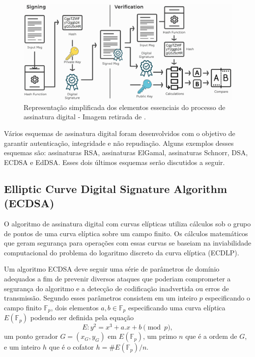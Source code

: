 \begin{figure}[h]
	\centering
	\includegraphics[keepaspectratio=true,scale=0.45]{figuras/assinatura digital.png}
	\caption{Representação simplificada dos elementos essenciais do processo de assinatura digital - Imagem retirada de \cite{nakov2018}.}
	\label{assinaturaDigitalSimp}
\end{figure}

Vários esquemas de assinatura digital foram desenvolvidos com o objetivo de garantir autenticação, integridade e não repudiação. Alguns exemplos desses esquemas são: assinaturas RSA, assinaturas ElGamal, assinaturas Schnorr, DSA, ECDSA e EdDSA. Esses dois últimos esquemas serão discutidos a seguir.

\subsection{Elliptic Curve Digital Signature Algorithm (ECDSA)}

O algoritmo de assinatura digital com curvas elípticas utiliza cálculos sob o grupo de pontos de uma curva elíptica sobre um campo finito. Os cálculos matemáticos que geram segurança para operações com essas curvas se baseiam na inviabilidade computacional do problema do logaritmo discreto da curva elíptica (ECDLP).

Um algoritmo ECDSA deve seguir uma série de parâmetros de domínio adequados a fim de prevenir diversos ataques que poderiam comprometer a segurança do algoritmo e a detecção de codificação inadvertida ou erros de transmissão. Segundo  esses parâmetros consistem em um inteiro $p$ especificando o campo finito $\mathbb{F}_p$, dois elementos $a, b \in \mathbb{F}_p $ especificando uma curva elíptica $E(\mathbb{F}_p)$ podendo ser definida pela equação
\begin{equation}
E : y^2 = x^3 + a.x + b \pmod{p},
\end{equation}
um ponto gerador $G = (x_G, y_G)$ em $E(\mathbb{F}_p)$, um primo $n$ que é a ordem de $G$, e um inteiro $h$ que é o cofator $h = \#E(\mathbb{F}_p) / n$.

